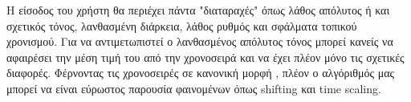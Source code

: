 Η είσοδος του χρήστη θα περιέχει πάντα "διαταραχές" όπως λάθος απόλυτος ή και
σχετικός τόνος, λανθασμένη διάρκεια, λάθος ρυθμός και σφάλματα τοπικού χρονισμού.
Για να αντιμετωπιστεί ο λανθασμένος απόλυτος τόνος μπορεί κανείς να αφαιρέσει
την μέση τιμή του από την χρονοσειρά και να έχει πλέον μόνο τις σχετικές
διαφορές. Φέρνοντας τις χρονοσειρές σε κανονική μορφή \cite{goldin1995similarity},
πλέον ο αλγόριθμός μας μπορεί να είναι εύρωστος παρουσία φαινομένων όπως
shifting και time scaling.
